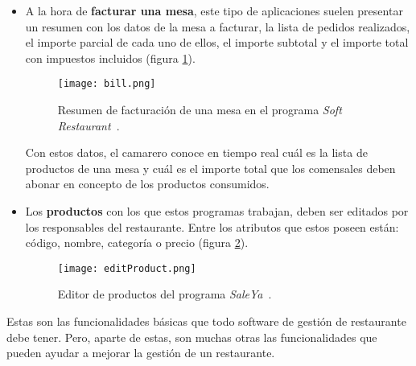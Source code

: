 \begin{itemize}
    \item A la hora de \textbf{facturar una mesa}, este tipo de aplicaciones 
    suelen presentar un resumen con los datos de la mesa a facturar, la lista 
    de pedidos realizados, el importe parcial de cada uno de ellos, el importe
    subtotal y el importe total con impuestos incluidos (figura
    \ref{fig:bill}).

    \begin{figure}[!h]
      \begin{center}
        \texttt{[image: bill.png]}
        \caption{Resumen de facturación de una mesa en el programa
        \emph{Soft Restaurant}~\cite{bib:softRestaurant}.}
        \label{fig:bill}
      \end{center}
    \end{figure}

    Con estos datos, el camarero conoce en tiempo real cuál es la lista de
    productos de una mesa y cuál es el importe total que los comensales deben
    abonar en concepto de los productos consumidos.

    \item Los \textbf{productos} con los que estos programas trabajan, deben 
    ser editados por los responsables del restaurante. Entre los atributos que
    estos poseen están: código, nombre, categoría o precio (figura
    \ref{fig:editProduct}).

    \begin{figure}[!h]
      \begin{center}
        \texttt{[image: editProduct.png]}
        \caption{Editor de productos del programa
        \emph{SaleYa}~\cite{bib:saleYa}.}
        \label{fig:editProduct}
      \end{center}
    \end{figure}
    \end{itemize}

    Estas son las funcionalidades básicas que todo software de 
    gestión de restaurante debe tener. Pero, aparte de estas, son muchas otras 
    las funcionalidades que pueden ayudar a mejorar la gestión de un 
    restaurante.

